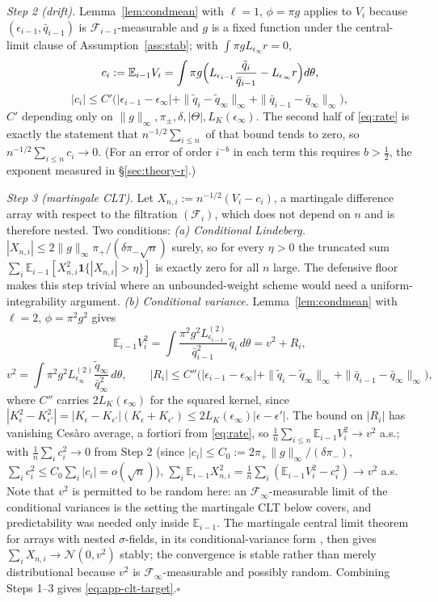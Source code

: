 \documentclass[10pt]{article}
\theoremstyle{plain}
\theoremstyle{definition}
\begin{document}
\emph{Step 2 (drift).} Lemma~\ref{lem:condmean} with $\ell=1$, $\phi=\pi g$ applies to $V_i$ because $(\epsilon_{i-1},\bar q_{i-1})$ is $\mathcal{F}_{i-1}$-measurable and $g$ is a fixed function under the central-limit clause of Assumption~\ref{ass:stab}; with $\int\pi gL_{\epsilon_\infty}r=0$,
\[
c_i:=\mathbb{E}_{i-1}V_i=\int\pi g\Bigl(L_{\epsilon_{i-1}}\frac{\tilde q_i}{\bar q_{i-1}}-L_{\epsilon_\infty}r\Bigr)d\theta,
\]
\[
|c_i|\le C'\bigl(|\epsilon_{i-1}-\epsilon_\infty|+\|\tilde q_i-\tilde q_\infty\|_\infty+\|\bar q_{i-1}-\bar q_\infty\|_\infty\bigr),
\]
$C'$ depending only on $\|g\|_\infty,\pi_\pm,\delta,|\Theta|,L_K(\epsilon_\infty)$. The second half of \eqref{eq:rate} is exactly the statement that $n^{-1/2}\sum_{i\le n}$ of that bound tends to zero, so $n^{-1/2}\sum_{i\le n}c_i\to0$. (For an error of order $i^{-b}$ in each term this requires $b>\tfrac12$, the exponent measured in \S\ref{sec:theory-r}.)

\emph{Step 3 (martingale CLT).} Let $X_{n,i}:=n^{-1/2}(V_i-c_i)$, a martingale difference array with respect to the filtration $(\mathcal{F}_i)$, which does not depend on $n$ and is therefore nested. Two conditions:
\emph{(a) Conditional Lindeberg.} $|X_{n,i}|\le2\|g\|_\infty\pi_+/(\delta\pi_-\sqrt n)$ surely, so for every $\eta>0$ the truncated sum $\sum_i\mathbb{E}_{i-1}[X^2_{n,i}\mathbf{1}\{|X_{n,i}|>\eta\}]$ is exactly zero for all $n$ large. The defensive floor makes this step trivial where an unbounded-weight scheme would need a uniform-integrability argument.
\emph{(b) Conditional variance.} Lemma~\ref{lem:condmean} with $\ell=2$, $\phi=\pi^2g^2$ gives
\[
\mathbb{E}_{i-1}V_i^2=\int\frac{\pi^2g^2L^{(2)}_{\epsilon_{i-1}}}{\bar q^2_{i-1}}\,\tilde q_i\,d\theta
=v^2+R_i,
\]
\[
v^2=\int\pi^2g^2L^{(2)}_{\epsilon_\infty}\frac{\tilde q_\infty}{\bar q^2_\infty}\,d\theta,
\qquad
|R_i|\le C''\bigl(|\epsilon_{i-1}-\epsilon_\infty|+\|\tilde q_i-\tilde q_\infty\|_\infty+\|\bar q_{i-1}-\bar q_\infty\|_\infty\bigr),
\]
where $C''$ carries $2L_K(\epsilon_\infty)$ for the squared kernel, since $|K^2_\epsilon-K^2_{\epsilon'}|=|K_\epsilon-K_{\epsilon'}|(K_\epsilon+K_{\epsilon'})\le2L_K(\epsilon_\infty)|\epsilon-\epsilon'|$. The bound on $|R_i|$ has vanishing Ces\`aro average, a fortiori from \eqref{eq:rate}, so $\tfrac1n\sum_{i\le n}\mathbb{E}_{i-1}V^2_i\to v^2$ a.s.; with $\tfrac1n\sum_ic^2_i\to0$ from Step 2 (since $|c_i|\le C_0:=2\pi_+\|g\|_\infty/(\delta\pi_-)$, $\sum_ic^2_i\le C_0\sum_i|c_i|=o(\sqrt n)$),
$\sum_i\mathbb{E}_{i-1}X^2_{n,i}=\tfrac1n\sum_i(\mathbb{E}_{i-1}V^2_i-c^2_i)\to v^2$ a.s. Note that $v^2$ is permitted to be random here: an $\mathcal{F}_\infty$-measurable limit of the conditional variances is the setting the martingale CLT below covers, and predictability was needed only inside $\mathbb{E}_{i-1}$.
The martingale central limit theorem for arrays with nested $\sigma$-fields, in its conditional-variance form \citep[Cor.~3.1, pp.~58--59]{hall1980martingale}, then gives $\sum_iX_{n,i}\to\mathcal{N}(0,v^2)$ stably; the convergence is stable rather than merely distributional because $v^2$ is $\mathcal{F}_\infty$-measurable and possibly random. Combining Steps 1--3 gives \eqref{eq:app-clt-target}.\hfill$\square$
\end{document}

